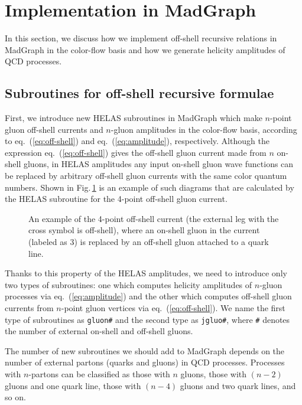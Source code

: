 \section{{\large Implementation in MadGraph}}
\label{implement}

In this section, we discuss how we implement off-shell recursive
relations in MadGraph in the color-flow
basis and how we generate helicity amplitudes of QCD processes.

\subsection{Subroutines for off-shell recursive formulae}
\label{subroutine}
First, we introduce new HELAS\cite{HELAS} subroutines in MadGraph which make
  $n$-point gluon off-shell currents and $n$-gluon amplitudes in the color-flow basis, according to
 eq.~(\ref{eq:off-shell}) and eq.~(\ref{eq:amplitude}),
  respectively. Although the expression eq.~(\ref{eq:off-shell}) gives
  the off-shell gluon current made from $n$
  on-shell gluons, in HELAS amplitudes any input on-shell gluon wave
  functions can be replaced by arbitrary off-shell gluon currents with the same
  color quantum numbers. Shown in
  Fig.\,\ref{fig:replace} is an
  example of such diagrams that are calculated by the HELAS subroutine for the
  4-point off-shell gluon current.
\begin{figure}
\centering
{}
\caption{An example of the 4-point off-shell
 current (the external leg with the cross symbol is off-shell), where an
 on-shell gluon in the current (labeled as 3) is replaced by an off-shell gluon attached to
 a quark line.}
\label{fig:replace}
\end{figure}
Thanks to this property of the HELAS
  amplitudes, we need to introduce only two types of subroutines: one which computes
   helicity amplitudes of $n$-gluon processes via
  eq.~(\ref{eq:amplitude}) and the other which computes off-shell gluon
  currents from $n$-point gluon vertices via eq.~(\ref{eq:off-shell}). We
  name the first type of subroutines as {\tt gluon\#} and the second
  type as
  {\tt jgluo\#}, where {\tt \#} denotes the number of external on-shell
  and off-shell gluons.

The number of new subroutines we should
  add to MadGraph depends on the number of external partons (quarks and
  gluons) in QCD
  processes. Processes with $n$-partons can be classified as those
  with $n$ gluons, those with $(n-2)$ gluons and one quark line, those
  with $(n-4)$ gluons and two quark lines, and so on.

